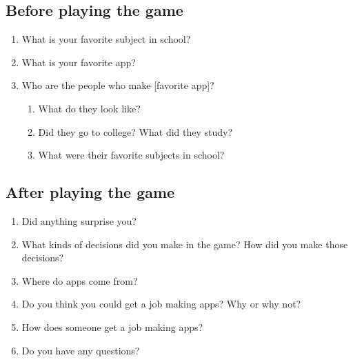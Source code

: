 \documentclass[letterpaper]{article}
\begin{document}
\subsection*{Before playing the game}

\begin{enumerate}
\item What is your favorite subject in school?
\item What is your favorite app?
\item Who are the people who make [favorite app]?
\begin{enumerate}
\item What do they look like?
\item Did they go to college? What did they study?
\item What were their favorite subjects in school?
\end{enumerate}
\end{enumerate}

\subsection*{After playing the game}

\begin{enumerate}
\item Did anything surprise you?
\item What kinds of decisions did you make in the game? How did you make those decisions?
\item Where do apps come from?
\item Do you think you could get a job making apps? Why or why not?
\item How does someone get a job making apps?
\item Do you have any questions?
\end{enumerate}

\clearpage
\end{document}
